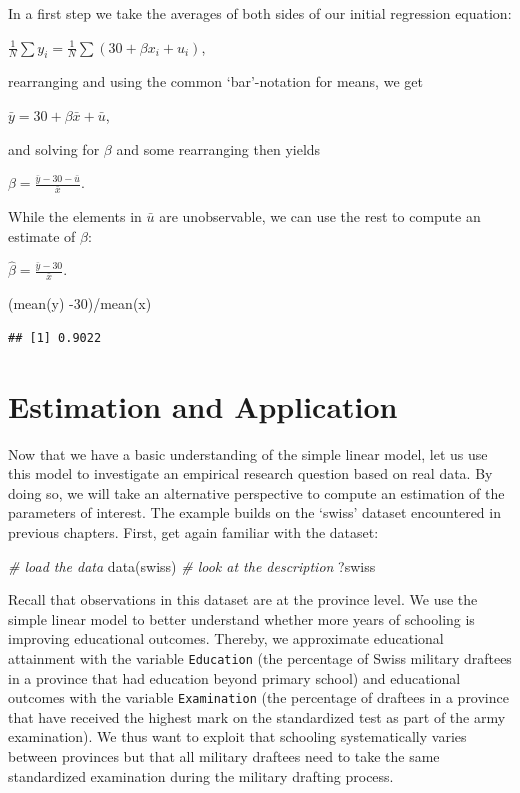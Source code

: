 \documentclass[
  12pt,
]{style/krantz}
\newenvironment{Shaded}{\begin{snugshade}}{\end{snugshade}}
\newcommand{\CommentTok}[1]{\textcolor[rgb]{0.56,0.35,0.01}{\textit{#1}}}
\newcommand{\DecValTok}[1]{\textcolor[rgb]{0.00,0.00,0.81}{#1}}
\newcommand{\FunctionTok}[1]{\textcolor[rgb]{0.00,0.00,0.00}{#1}}
\newcommand{\NormalTok}[1]{#1}
\newcommand{\SpecialCharTok}[1]{\textcolor[rgb]{0.00,0.00,0.00}{#1}}
\begin{document}
In a first step we take the averages of both sides of our initial regression equation:

\(\frac{1}{N}\sum{y_i}=\frac{1}{N}\sum{(30 + \beta x_{i} + u_{i})}\),

rearranging and using the common `bar'-notation for means, we get

\(\bar{y}=30+\beta\bar{x} + \bar{u}\),

and solving for \(\beta\) and some rearranging then yields

\(\beta=\frac{\bar{y}-30-\bar{u}}{\bar{x}}\).

While the elements in \(\bar{u}\) are unobservable, we can use the rest to compute an estimate of \(\beta\):

\(\hat{\beta}=\frac{\bar{y}-30}{\bar{x}}\).

\begin{Shaded}
\begin{Highlighting}[]
\NormalTok{(}\FunctionTok{mean}\NormalTok{(y) }\SpecialCharTok{{-}}\DecValTok{30}\NormalTok{)}\SpecialCharTok{/}\FunctionTok{mean}\NormalTok{(x)}
\end{Highlighting}
\end{Shaded}

\begin{verbatim}
## [1] 0.9022
\end{verbatim}

\hypertarget{estimation-and-application}{%
\section{Estimation and Application}\label{estimation-and-application}}

Now that we have a basic understanding of the simple linear model, let us use this model to investigate an empirical research question based on real data. By doing so, we will take an alternative perspective to compute an estimation of the parameters of interest. The example builds on the `swiss' dataset encountered in previous chapters. First, get again familiar with the dataset:

\begin{Shaded}
\begin{Highlighting}[]
\CommentTok{\# load the data}
\FunctionTok{data}\NormalTok{(swiss)}
\CommentTok{\# look at the description}
\NormalTok{?swiss}
\end{Highlighting}
\end{Shaded}

Recall that observations in this dataset are at the province level. We use the simple linear model to better understand whether more years of schooling is improving educational outcomes. Thereby, we approximate educational attainment with the variable \texttt{Education} (the percentage of Swiss military draftees in a province that had education beyond primary school) and educational outcomes with the variable \texttt{Examination} (the percentage of draftees in a province that have received the highest mark on the standardized test as part of the army examination). We thus want to exploit that schooling systematically varies between provinces but that all military draftees need to take the same standardized examination during the military drafting process.
\end{document}
